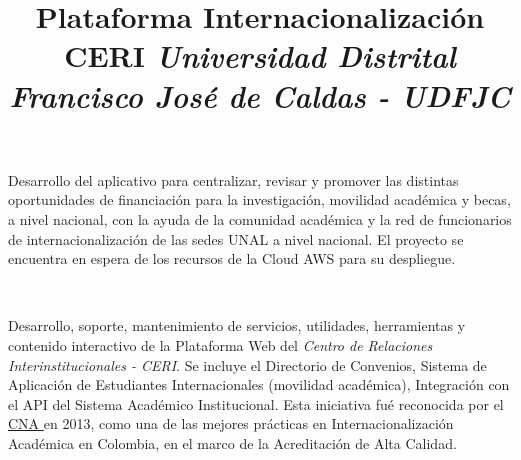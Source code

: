 \documentclass[overlapped,line,final]{../../templates/MichaelDeCorteCV/lib/res}
\begin{document}
\begin{resume}
\begin{position}
	Desarrollo del aplicativo para centralizar, revisar y promover las distintas oportunidades de financiación para la investigación, movilidad académica y becas, a nivel nacional, con la ayuda de la comunidad académica y la red de funcionarios de internacionalización de las sedes UNAL a nivel nacional. El proyecto se encuentra en espera de los recursos de la Cloud AWS para su despliegue.	
\end{position}



\title{\bf Plataforma Internacionalización CERI
	\newline \em Universidad Distrital Francisco José de Caldas - UDFJC
}
\
\begin{position}	
	Desarrollo, soporte, mantenimiento de servicios, utilidades, herramientas y contenido interactivo de la Plataforma Web del \textit {Centro de Relaciones Interinstitucionales - CERI}. Se incluye el Directorio de Convenios, Sistema de Aplicación de Estudiantes Internacionales (movilidad académica), Integración con el API del Sistema Académico Institucional. Esta iniciativa fué reconocida por el \href {https://www.cna.gov.co/portal/Divulgacion/Noticias/402269:Resultados-convocatoria-buenas-practicas-de-internacionalizacion-BPI-en-el-marco-de-la-acreditacion-de-alta-calidad}{CNA } en 2013, como una de las mejores prácticas en Internacionalización Académica en Colombia, en el marco de la Acreditación de Alta Calidad.
\end{position}


\end{resume}
\end{document}
